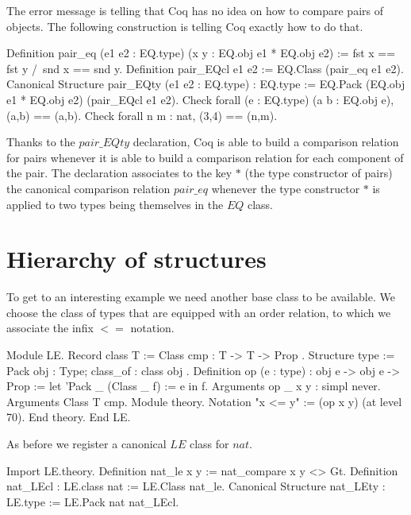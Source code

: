 The error message is telling that Coq has no idea on how to compare
pairs of objects.  The following construction is telling Coq exactly how to do
that.

\begin{coq_example}
Definition pair_eq (e1 e2 : EQ.type) (x y : EQ.obj e1 * EQ.obj e2) :=
  fst x == fst y /\ snd x == snd y.
Definition pair_EQcl e1 e2 := EQ.Class (pair_eq e1 e2).
Canonical Structure pair_EQty (e1 e2 : EQ.type) : EQ.type :=
  EQ.Pack (EQ.obj e1 * EQ.obj e2) (pair_EQcl e1 e2).
Check forall (e : EQ.type) (a b : EQ.obj e), (a,b) == (a,b).
Check forall n m : nat, (3,4) == (n,m).
\end{coq_example}

Thanks to the $pair\_EQty$ declaration, Coq is able to build a comparison
relation for pairs whenever it is able to build a comparison relation
for each component of the pair.  The declaration associates to the key
$*$ (the type constructor of pairs) the canonical comparison relation
$pair\_eq$ whenever the type constructor $*$ is applied to two types
being themselves in the $EQ$ class.

\section{Hierarchy of structures}

To get to an interesting example we need another base class to be available.
We choose the class of types that are equipped with an order relation,
to which we associate the infix $<=$ notation.

\begin{coq_example}
Module LE.
  Record class T := Class { cmp : T -> T -> Prop }.
  Structure type := Pack { obj : Type; class_of : class obj }.
  Definition op (e : type) : obj e -> obj e -> Prop :=
    let 'Pack _ (Class _ f) := e in f.
  Arguments op {_} x y : simpl never.
  Arguments Class {T} cmp.
  Module theory.
  Notation "x <= y" := (op x y) (at level 70).
  End theory.
End LE.
\end{coq_example}

As before we register a canonical $LE$ class for $nat$.

\begin{coq_example}
Import LE.theory.
Definition nat_le x y := nat_compare x y <> Gt.
Definition nat_LEcl : LE.class nat := LE.Class nat_le.
Canonical Structure nat_LEty : LE.type := LE.Pack nat nat_LEcl.
\end{coq_example}

